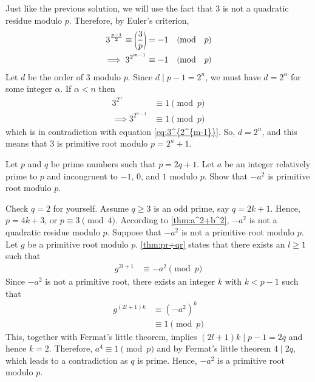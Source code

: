 \documentclass{subfile}
\begin{document}
	\begin{solution}[2]
		Just like the previous solution, we will use the fact that $3$ is not a quadratic residue modulo $p$. Therefore, by Euler's criterion,
			\begin{align}\label{eq:3^{2^{m-1}}}
				3^{\frac{p-1}{2}} \equiv \parenthesis{\frac{3}{p}}
					& = -1\pmod p\\
				\implies 3^{2^{m-1}}
					& \equiv -1 \pmod p
			\end{align}
		Let $d$ be the order of $3$ modulo $p$. Since $d\mid p-1=2^n$, we must have $d=2^{\alpha}$ for some integer $\alpha$. If $\alpha<n$ then
			\begin{align*}
				3^{2^{\alpha}}
					& \equiv 1\pmod{p}\\
				\implies 3^{2^{n-1}}
					& \equiv 1\pmod{p}
			\end{align*}
		which is in contradiction with equation \eqref{eq:3^{2^{m-1}}}. So, $d=2^n$, and this means that $3$ is primitive root modulo $p=2^n+1$.
	\end{solution}

	\begin{problem}
		Let $p$ and $q$ be prime numbers such that $ p=2q+1$. Let $a$ be an integer relatively prime to $p$ and incongruent to $-1$, $0$, and $1$ modulo $p$. Show that $ -a^2$ is primitive root modulo $p$.
	\end{problem}

	\begin{solution}
		Check $ q=2$ for yourself. Assume $ q \ge 3$ is an odd prime, say $q=2k+1$. Hence, $ p=4k+3$, or $p \equiv 3 \pmod 4$. According to \autoref{thm:a^2+b^2}, $ -a^2$ is not a quadratic residue modulo $ p$. Suppose that $ -a^2$ is not a primitive root modulo $p$. Let $ g$ be a primitive root modulo $p$. \autoref{thm:pr+qr} states that there exists an $ l\ge 1$ such that
			\begin{align*}
				g^{2l+1}
					& \equiv -a^2 \pmod p
			\end{align*}
		Since $-a^2$ is not a primitive root, there exists an integer $k$ with $ k<p-1$ such that
			\begin{align*}
				g^{(2l+1)k}
					& \equiv (-a^2)^k\\
					& \equiv 1 \pmod p
			\end{align*}
		This, together with Fermat's little theorem, implies $ (2l+1)k \mid p-1=2q$ and hence $ k=2$. Therefore, $ a^4 \equiv 1 \pmod p$ and by Fermat's little theorem $ 4\mid 2q$, which leads to a contradiction as $q$ is prime. Hence, $ -a^2$ is a primitive root modulo $p$.
	\end{solution}
\end{document}

